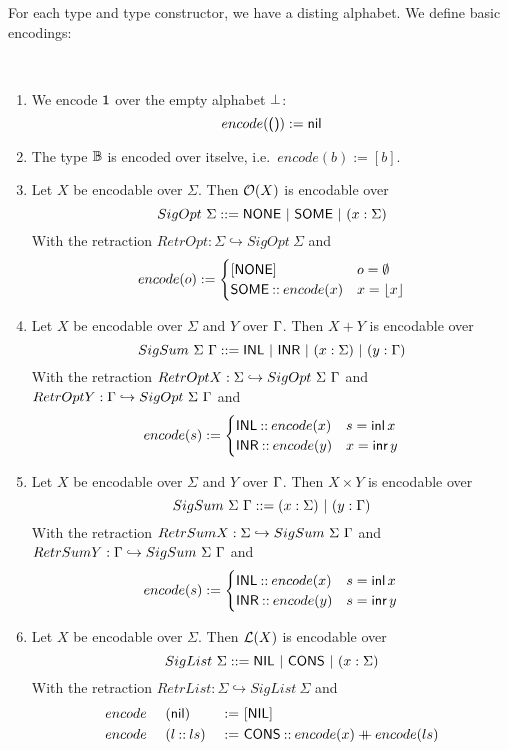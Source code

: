 For each type and type constructor, we have a disting alphabet.  We define basic encodings:
\begin{definition}
  \label{def:basic-encodings}
  ~
  \begin{enumerate}
  \item We encode $\textsf{1}$ over the empty alphabet $\bot$:
  \[ encode(\textsf{()}) := \textsf{nil}
  \]
  \item The type $\mathbb{B}$ is encoded over itselve, i.e.\ $encode(b):=[b]$.
  \item Let $X$ be encodable over $\Sigma$.  Then $\mathcal{O}(X)$ is encodable over
    \[ SigOpt~\Sigma ::= \textsf{NONE} ~|~ \textsf{SOME} ~|~ (x:\Sigma) \]
    With the retraction $RetrOpt : \Sigma \hookrightarrow SigOpt~\Sigma$ and
    \[
      encode(o) :=
      \begin{cases}
        [\textsf{NONE}] & o=\emptyset \\
        \textsf{SOME} \mathbin{::} encode(x) & x=\left\lfloor {x} \right\rfloor
      \end{cases}
    \]
  \item Let $X$ be encodable over $\Sigma$ and $Y$ over $\Gamma$.  Then $X+Y$ is encodable over
    \[ SigSum~\Sigma~\Gamma ::= \textsf{INL} ~|~ \textsf{INR} ~|~ (x:\Sigma) ~|~ (y:\Gamma) \] With the retraction
    $RetrOptX : \Sigma \hookrightarrow SigOpt~\Sigma~\Gamma$ and $RetrOptY : \Gamma \hookrightarrow SigOpt~\Sigma~\Gamma$ and
    \[
      encode(s) :=
      \begin{cases}
        \textsf{INL} \mathbin{::} encode(x) & s=\operatorname{\textsf{inl}} x \\
        \textsf{INR} \mathbin{::} encode(y) & x=\operatorname{\textsf{inr}} y
      \end{cases}
    \]
  \item Let $X$ be encodable over $\Sigma$ and $Y$ over $\Gamma$.  Then $X \times Y$ is encodable over
    \[ SigSum~\Sigma~\Gamma ::= (x:\Sigma) ~|~ (y:\Gamma) \] With the retraction
    $RetrSumX : \Sigma \hookrightarrow SigSum~\Sigma~\Gamma$ and \\$RetrSumY : \Gamma \hookrightarrow SigSum~\Sigma~\Gamma$ and
    \[
      encode(s) :=
      \begin{cases}
        \textsf{INL} \mathbin{::} encode(x) & s=\operatorname{\textsf{inl}} x \\
        \textsf{INR} \mathbin{::} encode(y) & s=\operatorname{\textsf{inr}} y
      \end{cases}
    \]
  \item Let $X$ be encodable over $\Sigma$.  Then $\mathcal{L}(X)$ is encodable over
    \[ SigList~\Sigma ::= \textsf{NIL} ~|~ \textsf{CONS} ~|~ (x:\Sigma) \]
    With the retraction $RetrList : \Sigma \hookrightarrow SigList~\Sigma$ and
    \begin{alignat*}{3}
      &encode~&&(\textsf{nil}      ) &~:=~& [\textsf{NIL}] \\
      &encode~&&(l \mathbin{::} ls) &~:=~& \textsf{CONS} \mathbin{::} encode(x) \mathbin{+\mkern-10mu+} encode(ls)
    \end{alignat*}
  \end{enumerate}
\end{definition}

